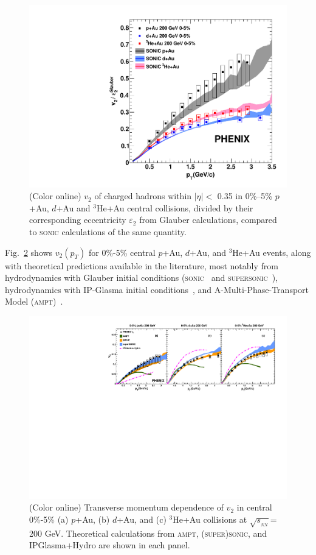 \documentclass[%
reprint,
showpacs,preprintnumbers,
 amsmath,amssymb,
 aps,
]{revtex4-1}
\newcommand{\pt}{\mbox{$p_T$}\xspace}
\newcommand{\sqsn}{\mbox{$\sqrt{s_{_{NN}}}$}\xspace}
\newcommand{\dau}{\mbox{$d$+Au}\xspace}
\newcommand{\pau}{\mbox{$p$+Au}\xspace}
\newcommand{\hau}{\mbox{$^3\text{He}$+Au}\xspace}
\begin{document}
\begin{figure}[htbp]
  \includegraphics[scale=0.45]{Figures/figure4.pdf}
  \caption{(Color online) $v_2$ of charged hadrons within $|\eta| <$ 0.35 in 0\%--5\% \pau, \dau and \hau central collisions, divided by their corresponding eccentricity $\varepsilon_2$ from Glauber calculations, compared to \textsc{sonic} calculations of the same quantity.}
\label{fig:figure4}
\end{figure}

Fig.~\ref{fig:figure5} shows $v_2(\pt)$ for 0\%-5\% central \pau, \dau, and \hau events, along with theoretical predictions available in the literature, most notably from hydrodynamics with Glauber initial conditions (\textsc{sonic}~\cite{Habich:2014jna} and \textsc{supersonic}~\cite{Romatschke:2015gxa}), hydrodynamics with IP-Glasma initial conditions~\cite{Schenke:2014gaa}, and A-Multi-Phase-Transport Model (\textsc{ampt})~\cite{lin_multiphase_2005}.

\begin{figure}[htbp]
  \includegraphics[scale=0.9]{Figures/figure5.pdf}
  \caption{(Color online) Transverse momentum dependence of $v_2$ in central 0\%-5\% (a) \pau, (b) \dau, and (c) \hau collisions at \sqsn = 200 GeV. Theoretical calculations from \textsc{ampt}, \textsc{(super)sonic}, and IPGlasma+Hydro are shown in each panel.}
\label{fig:figure5}
\end{figure}
\end{document}
